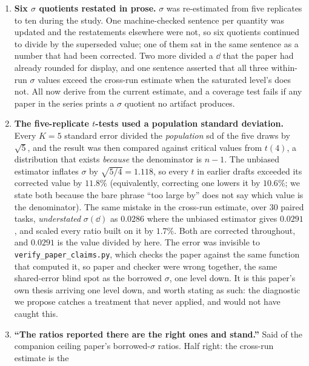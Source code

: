 \documentclass[11pt]{article}
\begin{document}
\begin{enumerate}
    load-bearing. False: ten released runs re-score one fixed genome on one fixed held-out set,
    giving $\sigma(\dd) = 0.0291$ on a thirty-task mean (\S\ref{sec:sigma}). Every effect in
    the series is now reported against it.
  \item \textbf{Six $\sigma$ quotients restated in prose.} $\sigma$ was re-estimated from five
    replicates to ten during the study. One machine-checked sentence per quantity was updated and
    the restatements elsewhere were not, so six quotients continued to divide by the superseded
    value; one of them sat in the same sentence as a number that had been corrected. Two more
    divided a $\dd$ that the paper had already rounded for display, and one sentence asserted
    that all three within-run $\sigma$ values exceed the cross-run estimate when the saturated
    level's does not. All now derive from the current estimate, and a coverage test fails if any
    paper in the series prints a $\sigma$ quotient no artifact produces.
  \item \textbf{The five-replicate $t$-tests used a population standard deviation.} Every
    $K{=}5$ standard error divided the \emph{population} sd of the five draws by $\sqrt{5}$, and
    the result was then compared against critical values from $t(4)$, a distribution that
    exists \emph{because} the denominator is $n-1$. The unbiased estimator inflates $\sigma$ by
    $\sqrt{5/4} = 1.118$, so every $t$ in earlier drafts exceeded its corrected value by
    $11.8\%$ (equivalently, correcting one lowers it by $10.6\%$; we state both because the
    bare phrase ``too large by'' does not say which value is the denominator). The same
    mistake in the cross-run estimate, over $30$ paired tasks, \emph{understated} $\sigma(\dd)$
    as $0.0286$ where the unbiased estimator gives $0.0291$, and scaled every ratio built on it
    by $1.7\%$. Both are corrected throughout, and $0.0291$ is the value divided by here. The
    error was invisible to \texttt{verify\_paper\_claims.py}, which checks the paper against the
    same function that computed it, so paper and checker were wrong together, the same
    shared-error blind spot as the borrowed $\sigma$, one level down.
    It is this paper's own thesis arriving one level down, and worth stating as such: the
    diagnostic we propose catches a treatment that never applied, and would not have caught this.
  \item \textbf{``The ratios reported there are the right ones and stand.''} Said of the
    companion ceiling paper's borrowed-$\sigma$ ratios. Half right: the cross-run estimate is the

\end{enumerate}
\end{document}
